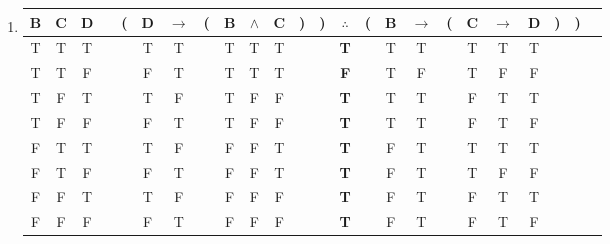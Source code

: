 \begin{enumerate}
	\item
	      \begin{tabular}{@{ }c@{ }@{ }c@{ }@{ }c | c@{ }@{}c@{}@{ }c@{ }@{ }c@{ }@{}c@{}@{ }c@{ }@{ }c@{ }@{ }c@{ }@{}c@{}@{}c@{}@{ }c@{ }@{}c@{}@{ }c@{ }@{ }c@{ }@{}c@{}@{ }c@{ }@{ }c@{ }@{ }c@{ }@{}c@{}@{}c@{}@{ }c}
		      B & C & D &  & ( & D & $\rightarrow$ & ( & B & $\land$ & C & ) & ) & $\therefore $ & ( & B & $\rightarrow$ & ( & C & $\rightarrow$ & D & ) & ) & \\
		      \hline
		      T & T & T &  &   & T & T             &   & T & T       & T &   &   & \textbf{T}    &   & T & T             &   & T & T             & T &   &   & \\
		      T & T & F &  &   & F & T             &   & T & T       & T &   &   & \textbf{F}    &   & T & F             &   & T & F             & F &   &   & \\
		      T & F & T &  &   & T & F             &   & T & F       & F &   &   & \textbf{T}    &   & T & T             &   & F & T             & T &   &   & \\
		      T & F & F &  &   & F & T             &   & T & F       & F &   &   & \textbf{T}    &   & T & T             &   & F & T             & F &   &   & \\
		      F & T & T &  &   & T & F             &   & F & F       & T &   &   & \textbf{T}    &   & F & T             &   & T & T             & T &   &   & \\
		      F & T & F &  &   & F & T             &   & F & F       & T &   &   & \textbf{T}    &   & F & T             &   & T & F             & F &   &   & \\
		      F & F & T &  &   & T & F             &   & F & F       & F &   &   & \textbf{T}    &   & F & T             &   & F & T             & T &   &   & \\
		      F & F & F &  &   & F & T             &   & F & F       & F &   &   & \textbf{T}    &   & F & T             &   & F & T             & F &   &   & \\
	      \end{tabular}

\end{enumerate}
% 
